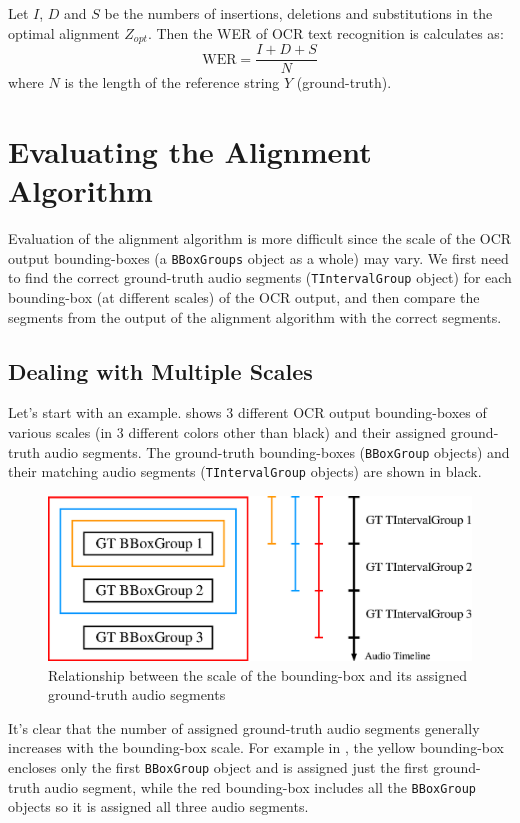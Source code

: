 Let $I$, $D$ and $S$ be the numbers of insertions, deletions and substitutions in the optimal alignment $Z_{opt}$. Then the WER of OCR text recognition is calculates as:
\begin{equation}
    \text{WER} = \frac{I + D + S}{N}
\end{equation}
where $N$ is the length of the reference string $Y$ (ground-truth).


\section{Evaluating the Alignment Algorithm}

Evaluation of the alignment algorithm is more difficult since the scale of the OCR output bounding-boxes (a \texttt{BBoxGroups} object as a whole) may vary. We first need to find the correct ground-truth audio segments (\texttt{TIntervalGroup} object) for each bounding-box (at different scales) of the OCR output, and then compare the segments from the output of the alignment algorithm with the correct segments. 

\subsection{Dealing with Multiple Scales}

Let's start with an example.  shows 3 different OCR output bounding-boxes of various scales (in 3 different colors other than black) and their assigned ground-truth audio segments. The ground-truth bounding-boxes (\texttt{BBoxGroup} objects) and their matching audio segments (\texttt{TIntervalGroup} objects) are shown in black. 

\begin{figure}[!tb]
    \centering
    \includegraphics[width=.8\textwidth]{eval-align-scale.eps}
    \caption{Relationship between the scale of the bounding-box and its assigned ground-truth audio segments}
    \label{fig:eval-align-scale}
\end{figure}

It's clear that the number of assigned ground-truth audio segments generally increases with the bounding-box scale. For example in , the yellow bounding-box encloses only the first \texttt{BBoxGroup} object and is assigned just the first ground-truth audio segment, while the red bounding-box includes all the \texttt{BBoxGroup} objects so it is assigned all three audio segments.

